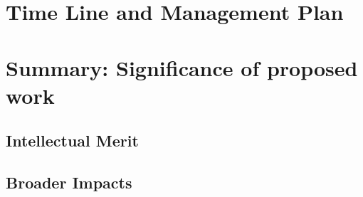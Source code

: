 \documentclass{proposalnsf}
\begin{document}
\section{Time Line and Management Plan}

\section{Summary:  Significance of proposed work}

\subsection{Intellectual Merit}

\subsection{Broader Impacts}



\newpage
{}
\renewcommand{\thepage} {E--\arabic{page}}




\newpage
{}
\renewcommand{\thepage} {G--\arabic{page}}
\end{document}
